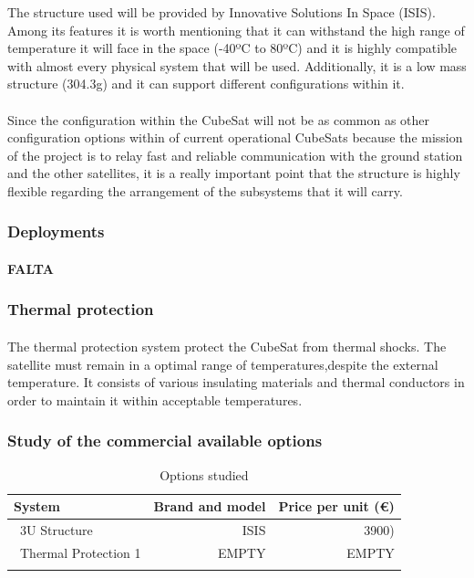 The structure used will be provided by Innovative Solutions In Space (ISIS). Among its features it is worth mentioning that it can withstand the high range of temperature it will face in the space (-40ºC to 80ºC) and it is highly compatible with almost every physical system that will be used. Additionally, it is a low mass structure (304.3g) and it can support different configurations within it.

\paragraph{}Since the configuration within the CubeSat will not be as common as other configuration options within of current operational CubeSats because the mission of the project is to relay fast and reliable communication with the ground station and the other satellites, it is a really important point that the structure is highly flexible regarding the arrangement of the subsystems that it will carry.

\subsubsection{Deployments}

\paragraph{}\textbf{FALTA}


\subsubsection{Thermal protection}
\paragraph{}The thermal protection system protect the CubeSat from thermal shocks. The satellite must remain in a optimal range of temperatures,despite the external temperature. It consists of various insulating materials and thermal conductors in order to maintain it within acceptable temperatures.

\subsubsection{Study of the commercial available options}

\begin{longtable}{| l | r | r | }
\hline
\rowcolor[gray]{0.80}	\textbf{System} &  \textbf{Brand and model}     & \textbf{Price per unit (\euro)}   \\
\hline
\endfirsthead

	   ~3U Structure & ISIS & 3900) \\
	   ~Thermal Protection 1 & EMPTY & EMPTY \\
	\hline

\caption{Options studied}
\label{epsoptionstable}
\end{longtable}
